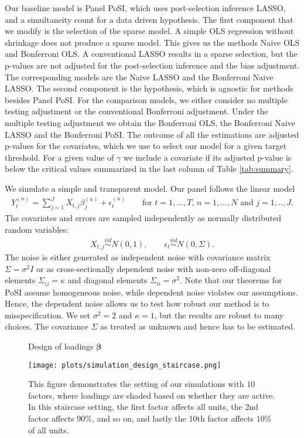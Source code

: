 \documentclass[11pt]{article}
\newcommand{\iid}{\stackrel{iid}{\sim}}
\newcommand\tcaptab[1]{\captionsetup{position=top, font=normalsize, labelfont=bf, textfont=normalfont, justification=centering, margin=0mm, aboveskip=1mm, belowskip=0mm, labelsep=colon, singlelinecheck=false}\caption{#1}}
\newcommand\bnotetab[1]{\captionsetup{position=bottom, font=footnotesize,  textfont=normalfont, margin=1mm, skip=2mm, justification=justified, singlelinecheck=false}\caption*{#1}}
\begin{document}
	
	Our baseline model is Panel PoSI, which uses post-selection inference LASSO, and a simultaneity count for a data driven hypothesis. The first component that we modify is the selection of the sparse model. A simple OLS regression without shrinkage does not produce a sparse model. This gives us the methods Naive OLS and Bonferroni OLS. A conventional LASSO results in a sparse selection, but the p-values are not adjusted for the post-selection inference and the bias adjustment. The corresponding models are the Naive LASSO and the Bonferroni Naive LASSO. The second component is the hypothesis, which is agnostic for methods besides Panel PoSI. For the comparison models, we either consider no multiple testing adjustment or the conventional Bonferroni adjustment. Under the multiple testing adjustment we obtain the Bonferroni OLS, the Bonferroni Naive LASSO and the Bonferroni PoSI. The outcome of all the estimations are adjusted p-values for the covariates, which we use to select our model for a given target threshold. For a given value of $\gamma$ we include a covariate if its adjusted p-value is below the critical values summarized in the last column of Table \ref{tab:summary}.
	
	We simulate a simple and transparent model. Our panel follows the linear model
	\begin{align*}
		Y_{t}^{(n)}=\sum_{j=1}^J X_{t,j}\beta_{j}^{(n)}+\epsilon_{t}^{(n)}\qquad \text{for $t=1,...,T$, $n=1,...,N$ and $j=1,..,J$.}
	\end{align*}
	The covariates and errors are sampled independently as normally distributed random variables:
	\begin{align*}
		X_{t,j}\iid N(0,1), \qquad \epsilon_{t}\iid N(0,\Sigma) .
	\end{align*}
	The noise is either generated as independent noise with covariance matrix $\Sigma= \sigma^2 I$ or as cross-sectionally dependent noise with non-zero off-diagonal elements $\Sigma_{ij}=\kappa$ and diagonal elements $\Sigma_{ii}=\sigma^2$. Note that our theorems for PoSI assume homogeneous noise, while dependent noise violates our assumptions. Hence, the dependent noise allows us to test how robust our method is to misspecification. We set $\sigma^2=2$ and $\kappa=1$, but the results are robust to many choices. The covariance $\Sigma$ as treated as unknown and hence has to be estimated.
	
	
	\begin{figure}[t!]
		\centering
		\tcaptab{Design of loadings $\bm{\beta}$} \label{fig:simulation-design}
		\begin{center}
			\texttt{[image: plots/simulation\_design\_staircase.png]}
		\end{center}
		\bnotetab{This figure demonstrates the setting of our simulations with $10$ factors, where loadings are shaded based on whether they are active. In this staircase setting, the first factor affects all units, the 2nd factor affects $90\%$, and so on, and lastly the 10th factor affects $10\%$ of all units.}
	\end{figure}
	
\end{document}
